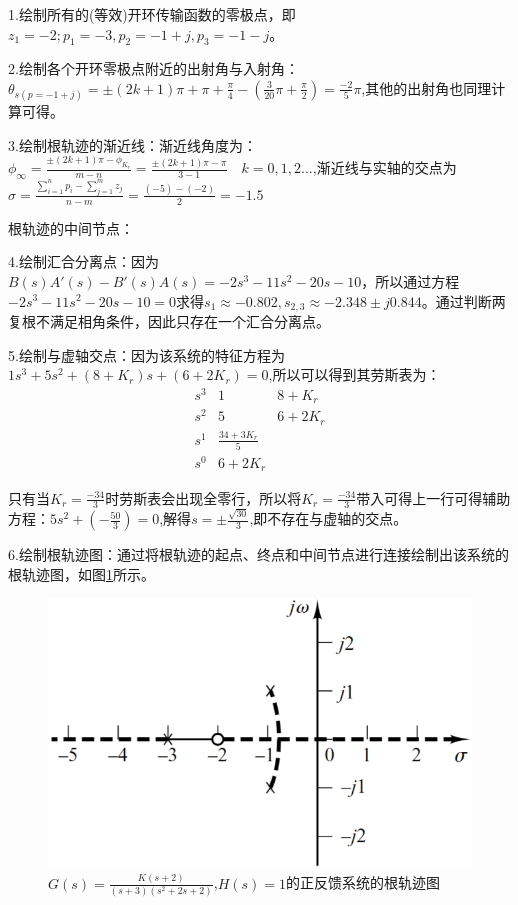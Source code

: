 \documentclass{article}
\numberwithin{equation}{section}
\numberwithin{figure}{section}
\begin{document}
1.绘制所有的(等效)开环传输函数的零极点，即$z_1=-2;p_1=-3,p_2=-1+j,p_3=-1-j$。

2.绘制各个开环零极点附近的出射角与入射角：$\theta_{s(p=-1+j)}=\pm (2k+1)\pi +\pi +\frac{\pi}{4}-(\frac{3}{20}\pi+\frac{\pi}{2})=\frac{-2}{5}\pi$,其他的出射角也同理计算可得。

3.绘制根轨迹的渐近线：渐近线角度为：$\phi_\infty = \frac{±(2k+1)\pi - \phi_{K_r}}{m-n}=\frac{±(2k+1)\pi - \pi}{3-1} \quad k=0,1,2...$,渐近线与实轴的交点为$\sigma =\frac{\sum_{i=1}^{n}p_i-\sum_{j=1}^{m}z_j}{n-m}= \frac{(-5)-(-2)}{2}=-1.5$

根轨迹的中间节点：

4.绘制汇合分离点：因为$B(s)A'(s)-B'(s)A(s)=-2s^3-11s^2-20s-10$，所以通过方程$-2s^3-11s^2-20s-10=0$求得$s_1≈-0.802,s_{2,3}≈-2.348±j0.844$。通过判断两复根不满足相角条件，因此只存在一个汇合分离点。

5.绘制与虚轴交点：因为该系统的特征方程为$1s^3+5s^2+(8+K_r)s+(6+2K_r)=0$,所以可以得到其劳斯表为：
\begin{equation}
    \begin{matrix}
        s^3&1&8+K_r\\
        s^2&5&6+2K_r\\
        s^1&\frac{34+3K_r}{5}\\
        s^0&6+2K_r
    \end{matrix}
\end{equation}

只有当$K_r=\frac{-34}{3}$时劳斯表会出现全零行，所以将$K_r=\frac{-34}{3}$带入可得上一行可得辅助方程：$5s^2+(-\frac{50}{3})=0$,解得$s=±\frac{\sqrt{30}}{3}$,即不存在与虚轴的交点。

6.绘制根轨迹图：通过将根轨迹的起点、终点和中间节点进行连接绘制出该系统的根轨迹图，如图\ref{PositiveFeedbackSystemRootlocus}所示。

\begin{figure}
    \centering
    \includegraphics[width=.4\textwidth]{Chapter6/PositiveFeedbackSystemRootlocus.png} %
    \caption{$G(s)=\frac{K(s+2)}{(s+3)(s^2+2s+2)}$,$H(s)=1$的正反馈系统的根轨迹图} %
    \label{PositiveFeedbackSystemRootlocus} %
\end{figure}
\end{document}
